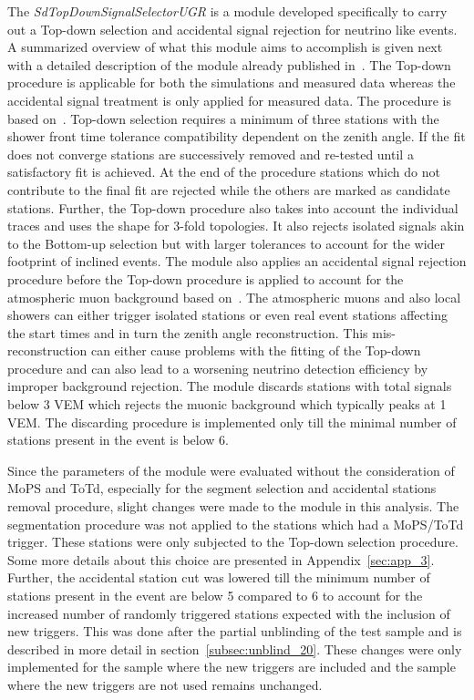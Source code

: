 The \textit{SdTopDownSignalSelectorUGR} is a module developed specifically to carry out a Top-down selection and accidental signal rejection for neutrino like events. A summarized overview of what this module aims to accomplish is given next with a detailed description of the module already published in~\cite{gap_top_down_module}. The Top-down procedure is applicable for both the simulations and measured data whereas the accidental signal treatment is only applied for measured data. The procedure is based on~\cite{gap_top_down_proc}. Top-down selection requires a minimum of three stations with the shower front time tolerance compatibility dependent on the zenith angle. If the fit does not converge stations are successively removed and re-tested until a satisfactory fit is achieved. At the end of the procedure stations which do not contribute to the final fit are rejected while the others are marked as candidate stations. Further, the Top-down procedure also takes into account the individual traces and uses the shape for 3-fold topologies. It also rejects isolated signals akin to the Bottom-up selection but with larger tolerances to account for the wider footprint of inclined events. The module also applies an accidental signal rejection procedure before the Top-down procedure is applied to account for the atmospheric muon background based on~\cite{gap_segment_selection}. The atmospheric muons and also local showers can either trigger isolated stations or even real event stations affecting the start times and in turn the zenith angle reconstruction. This mis-reconstruction can either cause problems with the fitting of the Top-down procedure and can also lead to a worsening neutrino detection efficiency by improper background rejection. The module discards stations with total signals below 3 VEM which rejects the muonic background which typically peaks at 1 VEM. The discarding procedure is implemented only till the minimal number of stations present in the event is below 6.

Since the parameters of the module were evaluated without the consideration of MoPS and ToTd, especially for the segment selection and accidental stations removal procedure, slight changes were made to the module in this analysis. The segmentation procedure was not applied to the stations which had a MoPS/ToTd trigger. These stations were only subjected to the Top-down selection procedure. Some more details about this choice are presented in Appendix~\ref{sec:app_3}. Further, the accidental station cut was lowered till the minimum number of stations present in the event are below 5 compared to 6 to account for the increased number of randomly triggered stations expected with the inclusion of new triggers. This was done after the partial unblinding of the test sample and is described in more detail in section~\ref{subsec:unblind_20}. These changes were only implemented for the sample where the new triggers are included and the sample where the new triggers are not used remains unchanged. 


